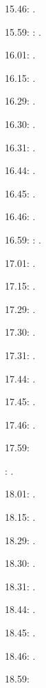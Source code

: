 \label{key}\documentclass[italian]{article}
\begin{document}
15.46:     .

15.59:     
:    .

16.01:     . 

16.15:     . 

16.29:     . 

16.30:     .

16.31:     .

16.44:     .

16.45:     .

16.46:     .

16.59:     
:    .

17.01:     . 

17.15:     . 

17.29:     . 

17.30:     .

17.31:     .

17.44:     .

17.45:     .

17.46:     .

17.59:     

:    .

18.01:     . 

18.15:     . 

18.29:     . 

18.30:     .

18.31:     .

18.44:     .

18.45:     .

18.46:     .

18.59:     
\end{document}

